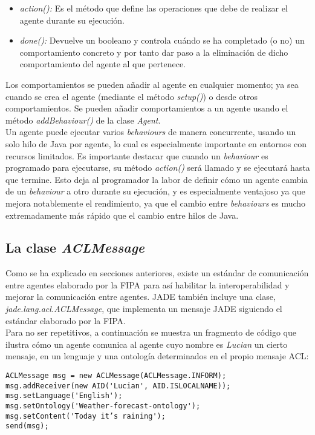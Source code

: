\begin{itemize}
	\item \textit{action():} Es el método que define las operaciones que debe de realizar el agente durante su ejecución.
	\item \textit{done():} Devuelve un booleano y controla cuándo se ha completado (o no) un comportamiento concreto y por tanto dar paso a la eliminación de dicho comportamiento del agente al que pertenece.
\end{itemize}

Los comportamientos se pueden añadir al agente en cualquier momento; ya sea cuando se crea el agente (mediante el método \textit{setup()}) o desde otros comportamientos. Se pueden añadir comportamientos a un agente usando el método \textit{addBehaviour()} de la clase \textit{Agent}.\\

Un agente puede ejecutar varios \textit{behaviours} de manera concurrente, usando un solo hilo de Java por agente, lo cual es especialmente importante en entornos con recursos limitados. Es importante destacar que cuando un \textit{behaviour} es programado para ejecutarse, su método \textit{action()} será llamado y se ejecutará hasta que termine. Esto deja al programador la labor de definir cómo un agente cambia de un \textit{behaviour} a otro durante su ejecución, y es especialmente ventajoso ya que mejora notablemente el rendimiento, ya que el cambio entre \textit{behaviours} es mucho extremadamente más rápido que el cambio entre hilos de Java.

\subsection{La clase \textit{ACLMessage}}

Como se ha explicado en secciones anteriores, existe un estándar de comunicación entre agentes elaborado por la FIPA para así habilitar la interoperabilidad y mejorar la comunicación entre agentes. JADE también incluye una clase, \textit{jade.lang.acl.ACLMessage}, que implementa un mensaje JADE siguiendo el estándar elaborado por la FIPA.\\

Para no ser repetitivos, a continuación se muestra un fragmento de código que ilustra cómo un agente comunica al agente cuyo nombre es \textit{Lucian} un cierto mensaje, en un lenguaje y una ontología determinados en el propio mensaje ACL:

\begin{lstlisting}
ACLMessage msg = new ACLMessage(ACLMessage.INFORM);
msg.addReceiver(new AID('Lucian', AID.ISLOCALNAME));
msg.setLanguage('English');
msg.setOntology('Weather-forecast-ontology');
msg.setContent('Today it’s raining');
send(msg);
\end{lstlisting}

